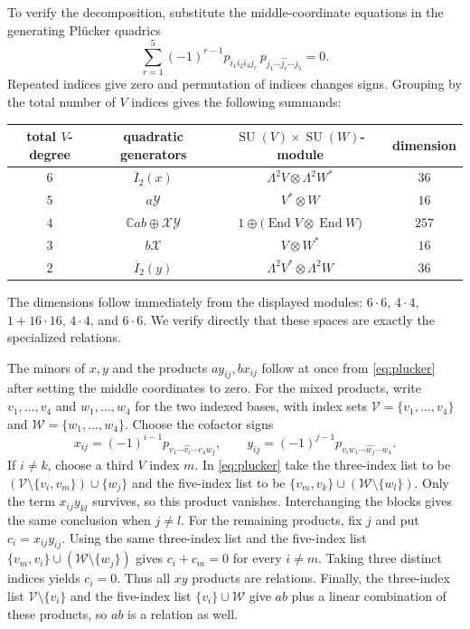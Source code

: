 \documentclass[11pt]{article}
\newcommand{\C}{\mathbb C}
\newcommand{\SU}{\operatorname{SU}}
\theoremstyle{definition}
\numberwithin{equation}{section}
\begin{document}
To verify the decomposition, substitute the middle-coordinate equations
in the generating Pl\"ucker quadrics
\begin{equation}\label{eq:plucker}
 \sum_{r=1}^{5}(-1)^{r-1}
 p_{i_1i_2i_3j_r}\,p_{j_1\cdots\widehat{j_r}\cdots j_5}=0.
\end{equation}
Repeated indices give zero and permutation of indices changes signs.
Grouping by the total number of $V$ indices gives the following summands:
\begin{center}
\begin{tabular}{c c c c}
\toprule
total $V$-degree & quadratic generators & $\SU(V)\times\SU(W)$-module & dimension \\
\midrule
$6$ & $\overline I_2(x)$ & $\Lambda^2V\otimes\Lambda^2W^*$ & $36$ \\
$5$ & $a\mathcal Y$ & $V^*\otimes W$ & $16$ \\
$4$ & $\C ab\oplus\mathcal X\mathcal Y$
 & $1\oplus\bigl(\operatorname{End}V\otimes\operatorname{End}W\bigr)$ & $257$ \\
$3$ & $b\mathcal X$ & $V\otimes W^*$ & $16$ \\
$2$ & $\overline I_2(y)$ & $\Lambda^2V^*\otimes\Lambda^2W$ & $36$ \\
\bottomrule
\end{tabular}
\end{center}
The dimensions follow immediately from the displayed modules:
$6\cdot6$, $4\cdot4$, $1+16\cdot16$, $4\cdot4$, and $6\cdot6$.
We verify directly that these spaces are exactly the specialized
relations.

The minors of $x,y$ and the products $ay_{ij},bx_{ij}$ follow at once
from \eqref{eq:plucker} after setting the middle coordinates to zero.
For the mixed products, write $v_1,\ldots,v_4$ and $w_1,\ldots,w_4$
for the two indexed bases, with index sets
$\mathcal V=\{v_1,\ldots,v_4\}$ and
$\mathcal W=\{w_1,\ldots,w_4\}$. Choose the cofactor signs
\[
 x_{ij}=(-1)^{i-1}p_{v_1\cdots\widehat{v_i}\cdots v_4w_j},
 \qquad
 y_{ij}=(-1)^{j-1}p_{v_iw_1\cdots\widehat{w_j}\cdots w_4}.
\]
If $i\ne k$, choose a third $V$ index $m$. In \eqref{eq:plucker}
take the three-index list to be
$(\mathcal V\setminus\{v_i,v_m\})\cup\{w_j\}$ and the five-index list to be
$\{v_m,v_k\}\cup(\mathcal W\setminus\{w_l\})$.
Only the term $x_{ij}y_{kl}$ survives, so this product vanishes.
Interchanging the blocks gives the same conclusion when $j\ne l$.
For the remaining products, fix $j$ and put $c_i=x_{ij}y_{ij}$.
Using the same three-index list and the five-index list
$\{v_m,v_i\}\cup(\mathcal W\setminus\{w_j\})$ gives
$c_i+c_m=0$ for every $i\ne m$.
Taking three distinct indices yields $c_i=0$. Thus all $xy$ products
are relations. Finally, the three-index list $\mathcal V\setminus\{v_i\}$
and the five-index list $\{v_i\}\cup\mathcal W$ give $ab$ plus a linear
combination of these products, so $ab$ is a relation as well.
\end{document}
